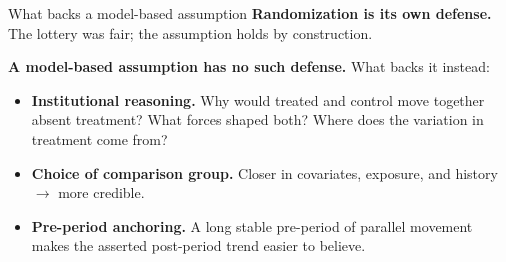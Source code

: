 \documentclass[aspectratio=169,11pt]{beamer}
\begin{document}
\begin{frame}{What backs a model-based assumption}
\footnotesize
\textbf{Randomization is its own defense.} \;The lottery was fair; the assumption holds by construction.

\vspace{0.5em}
\textbf{A model-based assumption has no such defense.} \;What backs it instead:

\vspace{0.5em}
\begin{itemize}\setlength\itemsep{4pt}
  \item \textbf{Institutional reasoning.} \;Why would treated and control move together absent treatment? \;What forces shaped both? \;Where does the variation in treatment come from?
  \item \textbf{Choice of comparison group.} \;Closer in covariates, exposure, and history $\to$ more credible.
  \item \textbf{Pre-period anchoring.} \;A long stable pre-period of parallel movement makes the asserted post-period trend easier to believe.
\end{itemize}

\vspace{0.4em}
\end{frame}
\end{document}
